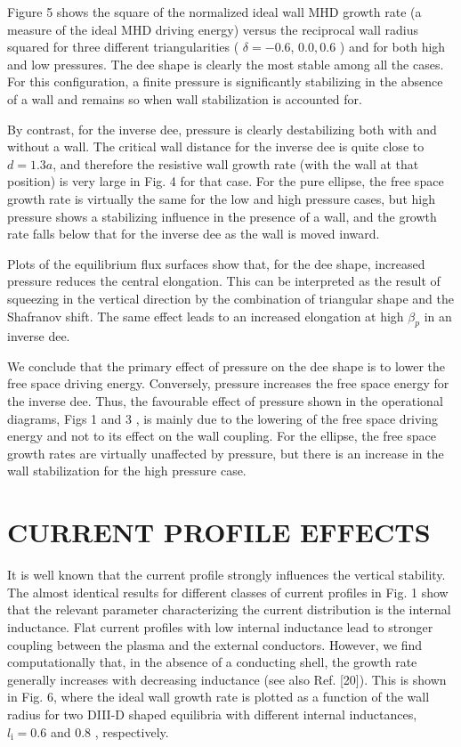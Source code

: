 \documentclass[utf8]{ctexart}
\begin{document}
\begin{sloppypar}
 Figure 5 shows the square of the normalized ideal wall MHD growth rate (a measure of the ideal MHD driving energy) versus the reciprocal wall radius squared for three different triangularities ( $\delta=-0.6$, $0.0,0.6$ ) and for both high and low pressures. The dee shape is clearly the most stable among all the cases. For this configuration, a finite pressure is significantly stabilizing in the absence of a wall and remains so when wall stabilization is accounted for.
 
 By contrast, for the inverse dee, pressure is clearly destabilizing both with and without a wall. The critical wall distance for the inverse dee is quite close to $d=1.3 a$, and therefore the resistive wall growth rate (with the wall at that position) is very large in Fig. 4 for that case. For the pure ellipse, the free space growth rate is virtually the same for the low and high pressure cases, but high pressure shows a stabilizing influence in the presence of a wall, and the growth rate falls below that for the inverse dee as the wall is moved inward.
 
 Plots of the equilibrium flux surfaces show that, for the dee shape, increased pressure reduces the central elongation. This can be interpreted as the result of squeezing in the vertical direction by the combination of triangular shape and the Shafranov shift. The same effect leads to an increased elongation at high $\beta_{p}$ in an inverse dee.
 

 We conclude that the primary effect of pressure on the dee shape is to lower the free space driving energy. Conversely, pressure increases the free space energy for the inverse dee. Thus, the favourable effect of pressure shown in the operational diagrams, Figs 1 and 3 , is mainly due to the lowering of the free space driving energy and not to its effect on the wall coupling. For the ellipse, the free space growth rates are virtually unaffected by pressure, but there is an increase in the wall stabilization for the high pressure case.
 
 \section{CURRENT PROFILE EFFECTS}
 It is well known that the current profile strongly influences the vertical stability. The almost identical results for different classes of current profiles in Fig. 1 show that the relevant parameter characterizing the current distribution is the internal inductance. Flat current profiles with low internal inductance lead to stronger coupling between the plasma and the external conductors. However, we find computationally that, in the absence of a conducting shell, the growth rate generally increases with decreasing inductance (see also Ref. [20]). This is shown in Fig. 6, where the ideal wall growth rate is plotted as a function of the wall radius for two DIII-D shaped equilibria with different internal inductances, $l_{\mathrm{i}}=0.6$ and 0.8 , respectively.
 

\end{sloppypar}
\end{document}
